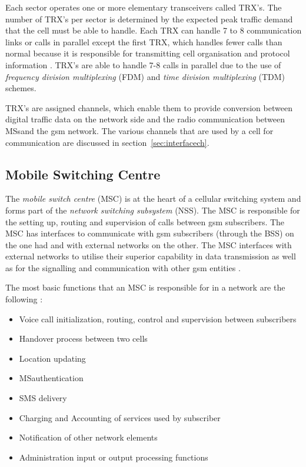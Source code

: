 Each sector operates one or more elementary transceivers called TRX’s. The number of TRX’s per sector is determined by the expected peak traffic demand that the cell must be able to handle. Each TRX can handle 7 to 8 communication links or calls in parallel except the first TRX, which handles fewer calls than normal because it is responsible for transmitting cell organisation and protocol information \cite{Eisenblatter}. TRX’s are able to handle 7-8 calls in parallel due to the use of \emph{frequency division multiplexing} (FDM) and \emph{time division multiplexing} (TDM) schemes. 

TRX’s are assigned channels, which enable them to provide conversion between digital traffic data on the network side and the radio communication between \glspl{MS}and the \gls{gsm} network\cite{ACOvsEA,FAPOrientationModel}. The various channels that are used by a cell for communication are discussed in section~\ref{sec:interfacech}.

\subsection{Mobile Switching Centre}

The \emph{mobile switch centre} (MSC) is at the heart of a cellular switching system and forms part of the \emph{network switching subsystem} (NSS). The MSC is responsible for the setting up, routing and supervision of calls between \gls{gsm} subscribers\cite{GSM92,GSMSysEngin}. The MSC has interfaces to communicate with \gls{gsm} subscribers (through the BSS) on the one had and with external networks on the other\cite{GSM92}. The MSC interfaces with external networks to utilise their superior capability in data transmission as well as for the signalling and communication with other \gls{gsm} entities \cite{GSM92}. 

The most basic functions that an MSC is responsible for in a network are the following \cite{wirelesstelcoMullet}:
\begin{itemize}
\item Voice call initialization, routing, control and supervision between subscribers
\item Handover process between two cells
\item Location updating
\item \gls{MS}authentication
\item SMS delivery
\item Charging and Accounting of services used by subscriber
\item Notification of other network elements
\item Administration input or output processing functions
\end{itemize}

